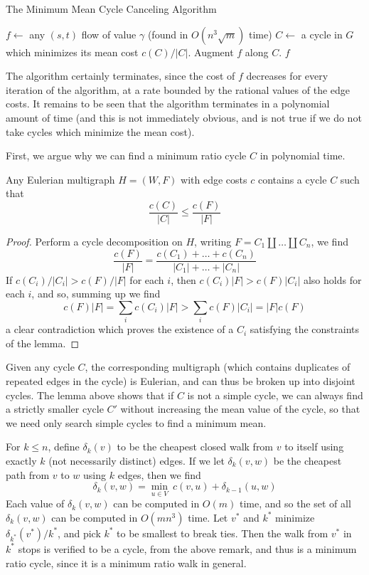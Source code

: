\begin{algorithm}
\caption{The Minimum Mean Cycle Canceling Algorithm}
\begin{algorithmic}[1]
\State $f \gets$ any $(s,t)$ flow of value $\gamma$ (found in $O(n^3 \sqrt{m})$ time)
\State $C \gets$ a cycle in $G$ which minimizes its mean cost $c(C)/|C|$.
\State Augment $f$ along $C$.
\EndWhile
\State \Return $f$
\end{algorithmic}
\end{algorithm}

The algorithm certainly terminates, since the cost of $f$ decreases for every iteration of the algorithm, at a rate bounded by the rational values of the edge costs. It remains to be seen that the algorithm terminates in a polynomial amount of time (and this is not immediately obvious, and is not true if we do not take cycles which minimize the mean cost).

First, we argue why we can find a minimum ratio cycle $C$ in polynomial time.

\begin{lemma}
    Any Eulerian multigraph $H = (W,F)$ with edge costs $c$ contains a cycle $C$ such that
    \[ \frac{c(C)}{|C|} \leq \frac{c(F)}{|F|} \]
\end{lemma}
\begin{proof}
    Perform a cycle decomposition on $H$, writing $F = C_1 \amalg \dots \amalg C_n$, we find
    \[ \frac{c(F)}{|F|} = \frac{c(C_1) + \dots + c(C_n)}{|C_1| + \dots + |C_n|} \]
    If $c(C_i)/|C_i| > c(F)/|F|$ for each $i$, then $c(C_i) |F| > c(F) |C_i|$ also holds for each $i$, and so, summing up we find
    \[ c(F) |F| = \sum_i c(C_i) |F| > \sum_i c(F) |C_i| = |F| c(F) \]
    a clear contradiction which proves the existence of a $C_i$ satisfying the constraints of the lemma.
\end{proof}

Given any cycle $C$, the corresponding multigraph (which contains duplicates of repeated edges in the cycle) is Eulerian, and can thus be broken up into disjoint cycles. The lemma above shows that if $C$ is not a simple cycle, we can always find a strictly smaller cycle $C'$ without increasing the mean value of the cycle, so that we need only search simple cycles to find a minimum mean.

For $k \leq n$, define $\delta_k(v)$ to be the cheapest closed walk from $v$ to itself using exactly $k$ (not necessarily distinct) edges. If we let $\delta_k(v,w)$ be the cheapest path from $v$ to $w$ using $k$ edges, then we find
%
\[ \delta_k(v,w) = \min_{u \in V}\ c(v,u) + \delta_{k-1}(u,w) \]
%
Each value of $\delta_k(v,w)$ can be computed in $O(m)$ time, and so the set of all $\delta_k(v,w)$ can be computed in $O(mn^3)$ time. Let $v^*$ and $k^*$ minimize $\delta_{k^*}(v^*)/k^*$, and pick $k^*$ to be smallest to break ties. Then the walk from $v^*$ in $k^*$ stops is verified to be a cycle, from the above remark, and thus is a minimum ratio cycle, since it is a minimum ratio walk in general.

